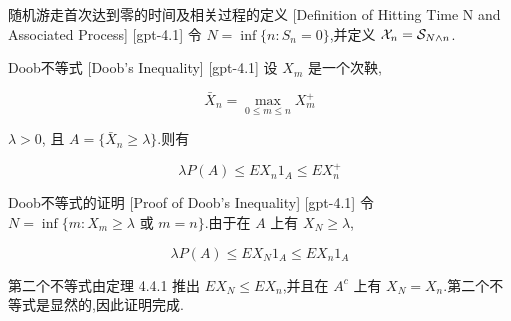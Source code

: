 \documentclass[UTF8]{ctexart}
\begin{document}
    
    
    \begin{dfn}
        {随机游走首次达到零的时间及相关过程的定义}
        [Definition of Hitting Time N and Associated Process]
        [gpt-4.1]
        令 $N = \inf \{ n : S_n = 0 \}$,并定义 ${\cal X}_n = {\cal S}_{N \wedge n}$.
    \end{dfn}
    
    
    
    \begin{thm}
        {Doob不等式}
        [Doob's Inequality]
        [gpt-4.1]
        设 $X_m$ 是一个次鞅,

\[
\bar{X}_n = \max_{0 \leq m \leq n} X_m^{+}
\]

$\lambda > 0$, 且 $A = \{\bar{X}_n \geq \lambda\}$.则有

\[
\lambda P(A) \leq E X_n 1_A \leq E X_n^{+}
\]

    \end{thm}
    
    
    
    \begin{prf}
        {Doob不等式的证明}
        [Proof of Doob's Inequality]
        [gpt-4.1]
        令 $N = \inf\{m : X_m \geq \lambda \text{ 或 } m = n\}$.由于在 $A$ 上有 $X_N \geq \lambda$,

\[
\lambda P(A) \leq E X_N 1_A \leq E X_n 1_A
\]

第二个不等式由定理 4.4.1 推出 $E X_N \leq E X_n$,并且在 $A^c$ 上有 $X_N = X_n$.第二个不等式是显然的,因此证明完成.

    \end{prf}
    
    
    
\end{document}
